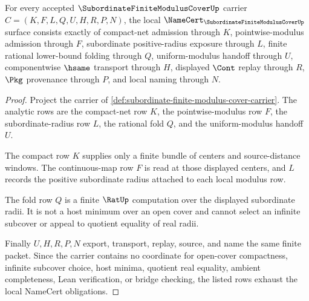 \begin{theorem}
\label{thm:subordinate-finite-modulus-cover-namecert-obligations}
For every accepted $\SubordinateFiniteModulusCoverUp$ carrier $C=(K,F,L,Q,U,H,R,P,N)$, the local $\NameCert_{\SubordinateFiniteModulusCoverUp}$ surface consists exactly of compact-net admission through $K$, pointwise-modulus admission through $F$, subordinate positive-radius exposure through $L$, finite rational lower-bound folding through $Q$, uniform-modulus handoff through $U$, componentwise $\hsame$ transport through $H$, displayed $\Cont$ replay through $R$, $\Pkg$ provenance through $P$, and local naming through $N$.
\end{theorem}
\begin{proof}
Project the carrier of \autoref{def:subordinate-finite-modulus-cover-carrier}. The analytic rows are the compact-net row $K$, the pointwise-modulus row $F$, the subordinate-radius row $L$, the rational fold $Q$, and the uniform-modulus handoff $U$.

The compact row $K$ supplies only a finite bundle of centers and source-distance windows. The continuous-map row $F$ is read at those displayed centers, and $L$ records the positive subordinate radius attached to each local modulus row.

The fold row $Q$ is a finite $\RatUp$ computation over the displayed subordinate radii. It is not a host minimum over an open cover and cannot select an infinite subcover or appeal to quotient equality of real radii.

Finally $U,H,R,P,N$ export, transport, replay, source, and name the same finite packet. Since the carrier contains no coordinate for open-cover compactness, infinite subcover choice, host minima, quotient real equality, ambient completeness, Lean verification, or bridge checking, the listed rows exhaust the local NameCert obligations.
\end{proof}


